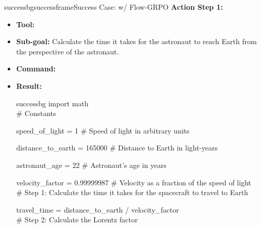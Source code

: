 \begin{small}
\begin{center}
\begin{casebox}{successbg}{successframe}{Success Case: \model w/ Flow-GRPO}
    \textbf{Action Step 1:}
    \begin{itemize}[nosep, leftmargin=*]
        \item \textbf{Tool:} 
        \item \textbf{Sub-goal:} Calculate the time it takes for the astronaut to reach Earth from the perspective of the astronaut.
        \item \textbf{Command:}

        \item \textbf{Result:}
        \begin{casecode}{successbg}
import math
\\

\hspace{0mm}\# Constants

\hspace{0mm}speed\_of\_light = 1  \# Speed of light in arbitrary units

\hspace{0mm}distance\_to\_earth = 165000  \# Distance to Earth in light-years

\hspace{0mm}astronaut\_age = 22  \# Astronaut's age in years

\hspace{0mm}velocity\_factor = 0.99999987  \# Velocity as a fraction of the speed of light
\\

\hspace{0mm}\# Step 1: Calculate the time it takes for the spacecraft to travel to Earth

\hspace{0mm}travel\_time = distance\_to\_earth / velocity\_factor
\\

\hspace{0mm}\# Step 2: Calculate the Lorentz factor


\end{casecode}
\end{itemize}
\end{casebox}
\end{center}
\end{small}
